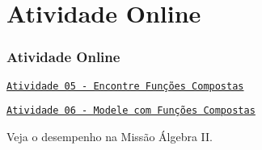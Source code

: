 \section{Atividade Online}
\begin{frame}
\frametitle{Atividade Online} 

\href{https://pt.khanacademy.org/math/algebra2/manipulating-functions/function-composition/e/compose-functions}
{{\tt Atividade 05 - Encontre Funções Compostas}}

\href{https://pt.khanacademy.org/math/algebra2/manipulating-functions/combining-and-composing-modeling-functions/e/modeling-with-composite-functions}
{{\tt Atividade 06 - Modele com Funções Compostas}}


Veja o desempenho na Missão Álgebra II.


\end{frame}
